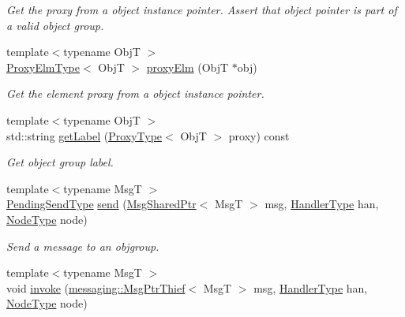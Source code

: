 \begin{DoxyCompactItemize}
\begin{DoxyCompactList}\small\item\em Get the proxy from a object instance pointer. Assert that object pointer is part of a valid object group. \end{DoxyCompactList}\item 
{\footnotesize template$<$typename ObjT $>$ }\\\hyperlink{structvt_1_1objgroup_1_1_obj_group_manager_adba6c8ecb0f4c30e719f1abb995cfc9b}{Proxy\+Elm\+Type}$<$ ObjT $>$ \hyperlink{structvt_1_1objgroup_1_1_obj_group_manager_a31f00bd509986001e3154af24239f24d}{proxy\+Elm} (ObjT $\ast$obj)
\begin{DoxyCompactList}\small\item\em Get the element proxy from a object instance pointer. \end{DoxyCompactList}\item 
{\footnotesize template$<$typename ObjT $>$ }\\std\+::string \hyperlink{structvt_1_1objgroup_1_1_obj_group_manager_a9de1e58ebc9fd03769840cddb3bd54d7}{get\+Label} (\hyperlink{structvt_1_1objgroup_1_1_obj_group_manager_aea65eef52f240a52210132eef5ce591f}{Proxy\+Type}$<$ ObjT $>$ proxy) const
\begin{DoxyCompactList}\small\item\em Get object group label. \end{DoxyCompactList}\item 
{\footnotesize template$<$typename MsgT $>$ }\\\hyperlink{structvt_1_1objgroup_1_1_obj_group_manager_a4f82f640edf670ba5a282074e5710921}{Pending\+Send\+Type} \hyperlink{structvt_1_1objgroup_1_1_obj_group_manager_a68be1bec70dd234b537809f8b8bf2ac7}{send} (\hyperlink{namespacevt_ab2b3d506ec8e8d1540aede826d84a239}{Msg\+Shared\+Ptr}$<$ MsgT $>$ msg, \hyperlink{namespacevt_af64846b57dfcaf104da3ef6967917573}{Handler\+Type} han, \hyperlink{namespacevt_a866da9d0efc19c0a1ce79e9e492f47e2}{Node\+Type} node)
\begin{DoxyCompactList}\small\item\em Send a message to an objgroup. \end{DoxyCompactList}\item 
{\footnotesize template$<$typename MsgT $>$ }\\void \hyperlink{structvt_1_1objgroup_1_1_obj_group_manager_a6b4dbae4a1da797a5d442de2cafc37f1}{invoke} (\hyperlink{structvt_1_1messaging_1_1_msg_ptr_thief}{messaging\+::\+Msg\+Ptr\+Thief}$<$ MsgT $>$ msg, \hyperlink{namespacevt_af64846b57dfcaf104da3ef6967917573}{Handler\+Type} han, \hyperlink{namespacevt_a866da9d0efc19c0a1ce79e9e492f47e2}{Node\+Type} node)

\end{DoxyCompactItemize}
